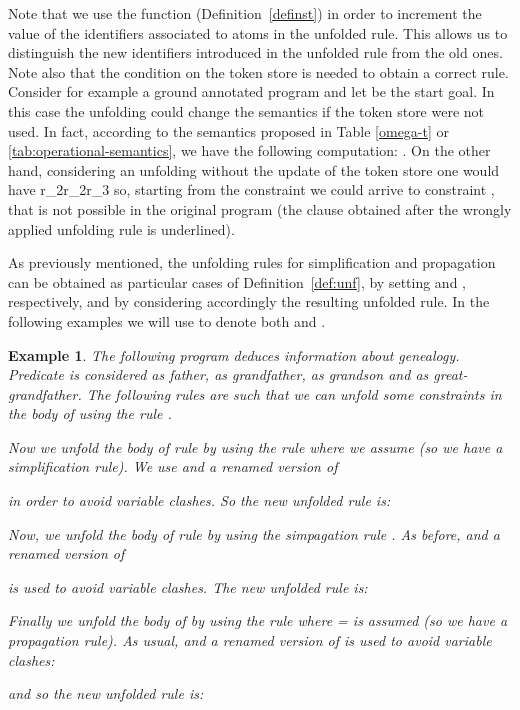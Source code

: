 \documentclass[final]{acmtrans2e}
\newtheorem{exa}[theorem]{Example}
\newenvironment{example}{\begin{exa}}{\end{exa}}
\begin{document}
Note that we use  the function   (Definition~\ref{definst})
in order to increment the value of the
identifiers associated to atoms in the unfolded rule. This allows
us to distinguish the new identifiers introduced in the unfolded
rule from the old ones. Note also that the condition on the token
store is needed to obtain a correct rule.  Consider for example a ground annotated
program   and let
 be  the start goal. In this case the unfolding could change
the semantics if the token store were not used. In fact, according
to the semantics proposed in Table \ref{omega-t} or
\ref{tab:operational-semantics}, we have the following
computation: . On the other hand,  considering an
unfolding without the update of  the token store one would have
r_2r_2r_3
so, starting from the constraint  we could arrive to constraint , that
is not possible in the original program (the clause obtained after
the wrongly applied unfolding rule is underlined).


As previously mentioned, the unfolding rules for simplification
and propagation can be obtained as particular cases of
Definition~\ref{def:unf}, by setting  and  , respectively, and by considering accordingly the
resulting unfolded rule. In the following examples we will use
 to denote both   and .

\begin{example}\label{ex:gen_adam}
The following program   deduces
information  about genealogy. Predicate  is considered as
father,  as grandfather,  as grandson and  as
great-grandfather. The following rules are such that we can unfold
some constraints in the body of  using the rule  .

Now we  unfold the body of rule  by using the rule
 where we assume  (so we have a simplification rule).  We use
 and a renamed version of 

 in order to avoid variable clashes.
So the new unfolded rule is:


Now, we unfold the body of rule  by using the simpagation
rule . As before,
 and a renamed version of 

is used to avoid variable clashes. The new unfolded rule is:



Finally we unfold the body of  by using the  rule where  =  is assumed (so we have a propagation rule).
As usual,  and a renamed version of  is used to avoid variable clashes:

and so the new unfolded rule is:

\end{example}
\end{document}
